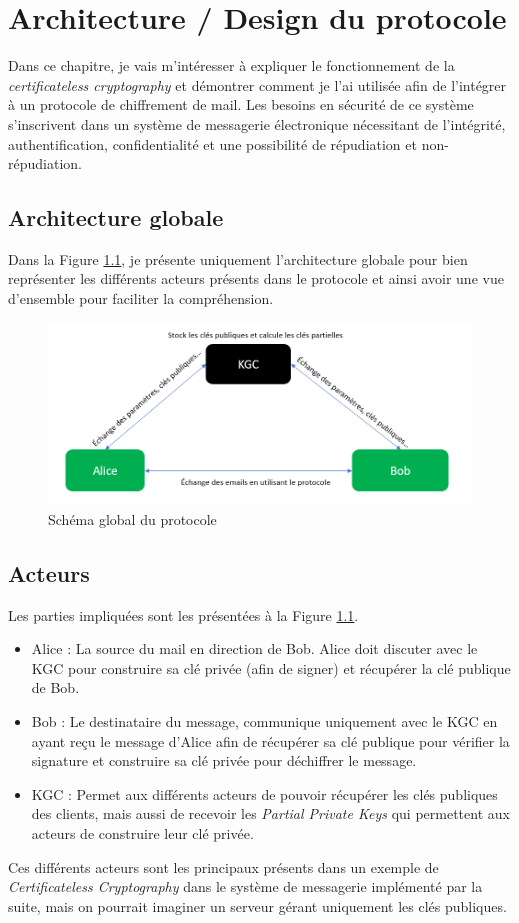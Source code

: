 \chapter{Architecture / Design du protocole}
\label{ch:arch}
Dans ce chapitre, je vais m'intéresser à expliquer le fonctionnement de la \textit{certificateless cryptography} et démontrer comment je l'ai utilisée afin de l'intégrer à un protocole de chiffrement de mail. Les besoins en sécurité de ce système s'inscrivent dans un système de messagerie électronique nécessitant de l'intégrité, authentification, confidentialité et une possibilité de répudiation et non-répudiation.
\section{Architecture globale}
Dans la Figure \ref{fig:globalProtocol}, je présente uniquement l'architecture globale pour bien représenter les différents acteurs présents dans le protocole et ainsi avoir une vue d'ensemble pour faciliter la compréhension.

\begin{figure}[h!]
	\centering
	\includegraphics[width=14cm]{images/SchemaGlobal.png}
	\caption{Schéma global du protocole}
	\label{fig:globalProtocol}
\end{figure}

\section{Acteurs}
Les parties impliquées sont les présentées à la Figure \ref{fig:globalProtocol}.
\begin{itemize}
	\item Alice : La source du mail en direction de Bob. Alice doit discuter avec le KGC pour construire sa clé privée (afin de signer) et récupérer la clé publique de Bob.
	\item Bob : Le destinataire du message, communique uniquement avec le KGC en ayant reçu le message d'Alice afin de récupérer sa clé publique pour vérifier la signature et construire sa clé privée pour déchiffrer le message.
	\item KGC : Permet aux différents acteurs de pouvoir récupérer les clés publiques des clients, mais aussi de  recevoir les \textit{Partial Private Keys} qui permettent aux acteurs de construire leur clé privée. 
\end{itemize}
Ces différents acteurs sont les principaux présents dans un exemple de \textit{Certificateless Cryptography} dans le système de messagerie implémenté par la suite, mais on pourrait imaginer un serveur gérant uniquement les clés publiques.

